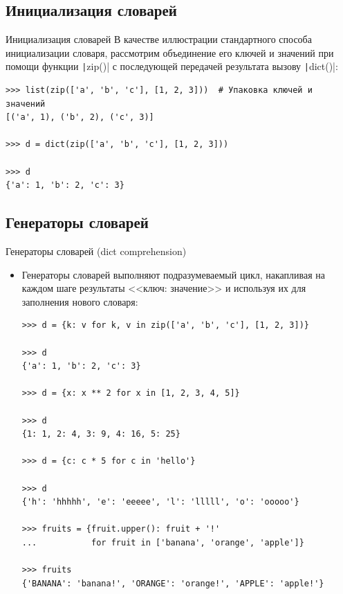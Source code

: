 \documentclass[aspectratio=169, mathserif]{beamer}%
\begin{document}
\subsection{Инициализация словарей}

\begin{frame}[fragile]{Инициализация словарей}
\scriptsize
В качестве иллюстрации  стандартного способа инициализации словаря, рассмотрим объединение его ключей и значений при помощи функции \texttt|zip()| с последующей передачей результата вызову \texttt|dict()|:

\begin{verbatim}
>>> list(zip(['a', 'b', 'c'], [1, 2, 3]))  # Упаковка ключей и значений
[('a', 1), ('b', 2), ('c', 3)]

>>> d = dict(zip(['a', 'b', 'c'], [1, 2, 3]))

>>> d
{'a': 1, 'b': 2, 'c': 3}
\end{verbatim}
\vfill
\end{frame}


\subsection{Генераторы словарей}

\begin{frame}[fragile]{Генераторы словарей (dict comprehension)}
\scriptsize
\begin{itemize}
\item Генераторы словарей выполняют подразумеваемый цикл, накапливая на каждом шаге результаты <<ключ: значение>> и используя их для заполнения нового словаря:

\begin{verbatim}
>>> d = {k: v for k, v in zip(['a', 'b', 'c'], [1, 2, 3])}

>>> d
{'a': 1, 'b': 2, 'c': 3}

>>> d = {x: x ** 2 for x in [1, 2, 3, 4, 5]}

>>> d
{1: 1, 2: 4, 3: 9, 4: 16, 5: 25}

>>> d = {c: c * 5 for c in 'hello'}

>>> d
{'h': 'hhhhh', 'e': 'eeeee', 'l': 'lllll', 'o': 'ooooo'}

>>> fruits = {fruit.upper(): fruit + '!' 
...           for fruit in ['banana', 'orange', 'apple']}

>>> fruits
{'BANANA': 'banana!', 'ORANGE': 'orange!', 'APPLE': 'apple!'}
\end{verbatim}
\end{itemize}
\vfill
\end{frame}
\end{document}
